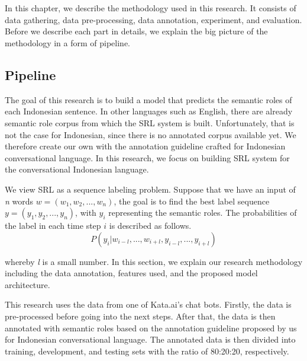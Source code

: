 \chapter{\babTiga}\label{bab:tiga}
In this chapter, we describe the methodology used in this research. It consists of data gathering, data pre-processing, data annotation, experiment, and evaluation. Before we describe each part in details, we explain the big picture of the methodology in a form of pipeline.

\section{Pipeline}
The goal of this research is to build a model that predicts the semantic roles of each Indonesian sentence. In other languages such as English, there are already semantic role corpus from which the SRL system is built. Unfortunately, that is not the case for Indonesian, since there is no annotated corpus available yet. We therefore create our own with the annotation guideline crafted for Indonesian conversational language. In this research, we focus on building SRL system for the conversational Indonesian language.

We view SRL as a sequence labeling problem. Suppose that we have an input of \textit{n} words $w = (w_{1}, w_{2}, ..., w_{n})$, the goal is to find the best label sequence $y = (y_{1}, y_{2}, ..., y_{n})$, with $y_{i}$ representing the semantic roles. The probabilities of the label in each time step $i$ is described as follows.
\begin{equation}
P(y_{i}|w_{i-l}, ..., w_{i+l},y_{i-l}, ..., y_{i+l})
\end{equation}

whereby \textit{l} is a small number. In this section, we explain our research methodology including the data annotation, features used, and the proposed model architecture. 

This research uses the data from one of Kata.ai's chat bots. Firstly, the data is pre-processed before going into the next steps. After that, the data is then annotated with semantic roles based on the annotation guideline proposed by us for Indonesian conversational language. The annotated data is then divided into training, development, and testing sets with the ratio of 80:20:20, respectively.

